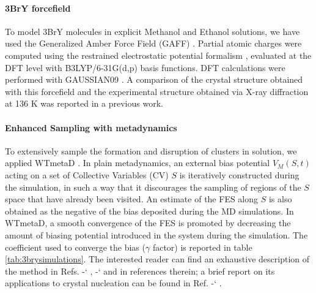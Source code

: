 \documentclass[journal=cgdefu,manuscript=article,layout=twocolumn]{achemso}
\newcommand*{\citen}[1]{%
  \begingroup
    \romannumeral-`\x %
    \setcitestyle{numbers}%
    \cite{#1}%
  \endgroup   
}
\begin{document}
\paragraph{3BrY forcefield} To model 3BrY molecules in explicit Methanol and Ethanol solutions, we have used the Generalized Amber Force Field (GAFF) \cite{GAFF,GAFF1}. Partial atomic charges were computed using the restrained electrostatic potential formalism \cite{RESP}, evaluated at the DFT level with B3LYP/6-31G(d,p) basis functions. DFT calculations were performed with GAUSSIAN09 \cite{g09}. A comparison of the crystal structure obtained with this forcefield and the experimental structure obtained via X-ray diffraction at 136 K was reported in a previous work\cite{salvalaglio20141,beltran20021}.

\paragraph{Enhanced Sampling with metadynamics}To extensively sample the formation and disruption of clusters in solution, we  applied WTmetaD \cite{Barducci2008}. 
In plain metadynamics\cite{laio2002escaping}, an external bias potential $V_M(S,t)$ acting on a set of Collective Variables (CV) $S$ is iteratively constructed during the simulation, in such a way that it discourages the sampling of regions of the $S$ space that have already been visited. An estimate of the FES along $S$ is also obtained as the negative of the bias deposited during the MD simulations. 
In WTmetaD, a smooth convergence of the FES is promoted by decreasing the amount of biasing potential introduced in the system during the simulation. The coefficient used to converge the bias ($\gamma$ factor) is reported in table \ref{tab:3brysimulations}. The interested reader can find an exhaustive description of the method in Refs. \citen{barducci2011metadynamics},\citen{valsson2016enhancing} and in references therein; a brief report on its applications to crystal nucleation can be found in Ref. 
\citen{giberti2015metadynamics}.
\end{document}
